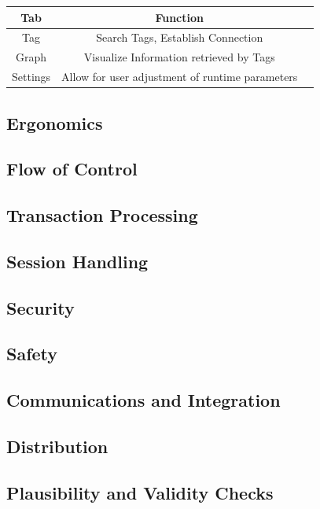 \documentclass[]{article}
\begin{document}
\begin{tabular}{|c|c|c|}
\hline
 Tab & Function\\
 \hline
 Tag & Search Tags, Establish Connection \\
 Graph & Visualize Information retrieved by Tags \\
 Settings & Allow for user adjustment of runtime parameters\\
 \hline
\end{tabular}

\subsection{Ergonomics}

\subsection{Flow of Control}

\subsection{Transaction Processing}

\subsection{Session Handling}

\subsection{Security}

\subsection{Safety}

\subsection{Communications and Integration}

\subsection{Distribution}

\subsection{Plausibility and Validity Checks}
\end{document}
